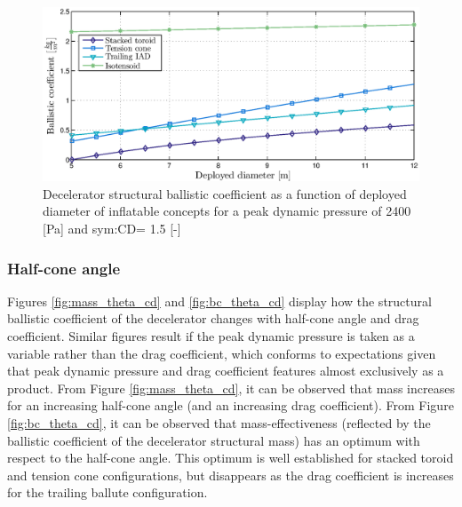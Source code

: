 \begin{figure}[H]
\centering
\includegraphics[width = 1.0\textwidth]{Figure/bc_diav2.eps}
\caption{Decelerator structural ballistic coefficient as a function of deployed diameter of inflatable concepts for a peak dynamic pressure of 2400 [Pa] and \gls{sym:CD}= 1.5 [-]}
\label{fig:bc_dia}
\end{figure}

\subsubsection{Half-cone angle}
Figures \ref{fig:mass_theta_cd} and \ref{fig:bc_theta_cd} display how the structural ballistic coefficient of the decelerator changes with half-cone angle and drag coefficient. Similar figures result if the peak dynamic pressure is taken as a variable rather than the drag coefficient, which conforms to expectations given that peak dynamic pressure and drag coefficient features almost exclusively as a product. From Figure \ref{fig:mass_theta_cd}, it can be observed that mass increases for an increasing half-cone angle (and an increasing drag coefficient). From  Figure \ref{fig:bc_theta_cd}, it can be observed that mass-effectiveness (reflected by the ballistic coefficient of the decelerator structural mass) has an optimum with respect to the half-cone angle. This optimum is well established for stacked toroid and tension cone configurations, but disappears as the drag coefficient is increases for the trailing ballute configuration.

